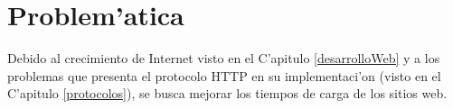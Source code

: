 \chapter{Problem'atica}

Debido al crecimiento de Internet visto en el C'apitulo \ref{desarrolloWeb} y a los problemas que presenta el protocolo HTTP en su implementaci'on (visto en el C'apitulo \ref{protocolos}), se busca mejorar los tiempos de carga de los sitios web. 

